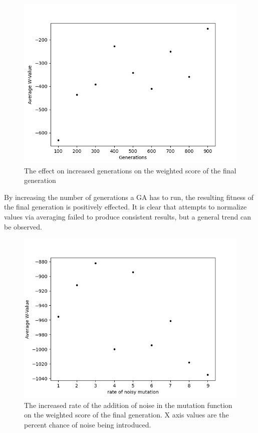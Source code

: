 \documentclass[12pt, conference]{IEEEtran}
\begin{document}
\begin{figure}[htb]
\centerline{\includegraphics[scale=0.5]{Figures/Generation_Averages.png}}
\caption{The effect on increased generations on the weighted score of the final generation}
\label{fig. 1}
\end{figure}

\par
By increasing the number of generations a GA has to run, the resulting fitness of the final generation is positively effected.
It is clear that attempts to normalize values via averaging failed to produce consistent results, but a general trend can be observed.

\begin{figure}[H]
\centerline{\includegraphics[scale=0.5]{Figures/Mutation_Chance_Averages.png}}
\caption{The increased rate of the addition of noise in the mutation function on the weighted score of the final generation. X axis values are the percent chance of noise being introduced.}
\label{fig. 2}
\end{figure}
\end{document}
